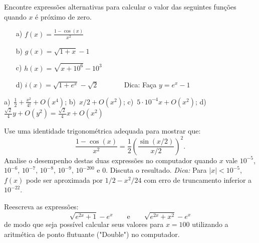 \begin{exer} Encontre expressões alternativas para calcular o valor das seguintes funções quando $x$ é próximo de zero.
\begin{itemize}
\item[a)] $f(x)=\frac{1-\cos(x)}{x^2}$
\item[b)] $g(x)=\sqrt{1+x}-1$
\item[c)] $h(x)=\sqrt{x+10^6}-10^3$
\item[d)] $i(x)=\sqrt{1+e^{x}}-\sqrt{2}$ ~~~~~~ Dica: Faça $y=e^{x}-1$
\end{itemize}
\end{exer}
\begin{resp}
  
    a)~$\frac{1}{2}+\frac{x^2}{4!}+O(x^4)$; b)~$x/2+O(x^2)$; c)~$5\cdot 10^{-4}x+O(x^2)$; d)~$\frac{\sqrt{2}}{4}y+O(y^{2})=\frac{\sqrt{2}}{4}x+O(x^2)$
  
\end{resp}

\begin{exer} Use uma identidade trigonométrica adequada para mostrar que:
  \begin{equation*}
    \frac{1-\cos(x)}{x^2}= \frac{1}{2} \left(\frac{\sin(x/2)}{x/2}\right)^2.
  \end{equation*}
Analise o desempenho destas duas expressões no computador quando $x$ vale $10^{-5}$, $10^{-6}$, $10^{-7}$, $10^{-8}$, $10^{-9}$, $10^{-200}$ e $0$. Discuta o resultado.
\emph{Dica:} Para $|x|<10^{-5}$, $f(x)$ pode ser aproximada por $1/2-x^2/24$ com erro de truncamento inferior a $10^{-22}$.
\end{exer}



\begin{exer} Reescreva as expressões:
  $$\sqrt{e^{2x}+1}-e^x \qquad\text{e}\qquad \sqrt{e^{2x}+x^2}-e^x $$
  de modo que seja possível calcular seus valores para $x=100$ utilizando a aritmética de ponto flutuante ("Double") no computador.
\end{exer}

